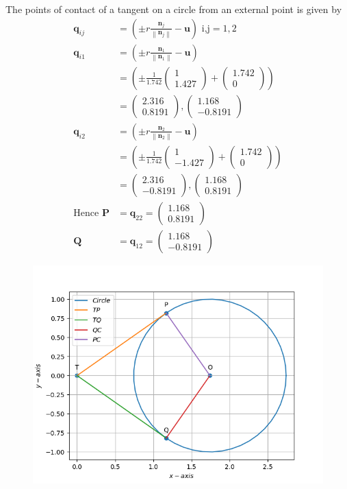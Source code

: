 \documentclass[12pt]{article}
\providecommand{\brak}[1]{\ensuremath{\left(#1\right)}}
\providecommand{\norm}[1]{\left\lVert#1\right\rVert}
\newcommand{\myvec}[1]{\ensuremath{\begin{pmatrix}#1\end{pmatrix}}}
\let\vec\mathbf
\begin{document}
The points of contact of a tangent on a circle from an external point is given by
\begin{align}
	\vec{q}_{ij} &= \brak{\pm r\frac{\vec{n}_j}{\norm{\vec{n}_j}}-\vec{u}} \text{ i,j} = 1,2\\
	\vec{q}_{i1} &= \brak{\pm r\frac{\vec{n}_1}{\norm{\vec{n}_1}}-\vec{u}}\\
	             &= \brak{\pm\frac{1}{1.742}\myvec{1\\1.427}+\myvec{1.742\\0}}\\
		     &= \myvec{2.316\\0.8191},\myvec{1.168\\-0.8191}\\ 		     
	\vec{q}_{i2} &= \brak{\pm r\frac{\vec{n}_2}{\norm{\vec{n}_2}}-\vec{u}}\\
	             &= \brak{\pm\frac{1}{1.742}\myvec{1\\-1.427}+\myvec{1.742\\0}}\\
		     &= \myvec{2.316\\-0.8191},\myvec{1.168\\0.8191}\\
	\text{Hence } \vec{P} &= \vec{q}_{22} = \myvec{1.168\\0.8191}\\
	\vec{Q} &= \vec{q}_{12} = \myvec{1.168\\-0.8191}		
\end{align}
\begin{figure}[!h]
	\begin{center} 
	    \includegraphics[width=\columnwidth]{figs/tan2}
	\end{center}
\caption{}
\label{fig:Fig1}
\end{figure}
\end{document}
